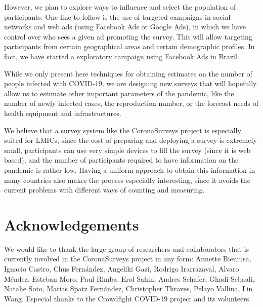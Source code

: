 \documentclass[sigconf]{acmart}
\newcommand{\af}[1]{{#1}}
\begin{document}
However, we plan to explore ways to influence \af{and select} the population of participants. One line to follow is the use of targeted campaigns in social networks and web ads (using Facebook Ads or Google Ads), in which we have control over who sees a given ad promoting the survey. This will allow targeting participants from certain geographical areas and certain demographic profiles. \af{In fact, we have started a exploratory campaign using Facebook Ads in Brazil.}

While we only present here techniques for obtaining estimates on the number of people infected with COVID-19, we are designing new surveys that will hopefully allow us to estimate other important parameters of the pandemic, like the number of newly infected cases, the reproduction number, or the forecast needs of health equipment and infrastructures.

We believe that a survey system like the CoronaSurveys project is especially suited for LMICs, since the cost of preparing and deploying a survey is extremely small, participants can use very simple devices to fill the survey (since it is web based), and the number of participants required to have information on the pandemic is rather low. Having a uniform approach to obtain this information in many countries also makes the process especially interesting, since it avoids the current problems with different ways of counting and measuring. 


\section{Acknowledgements}

We would like to thank the large group of researchers and collaborators that is currently involved in the CoronaSurveys project in any form: 
Annette Bieniusa,
Ignacio Castro, 
Chus Fernández,
Angeliki Gazi, 
Rodrigo Irarrazaval,
Alvaro Méndez,
Esteban Moro,
Paul Rimba,
Erol Sahin,
Andres Schafer,
Ghadi Sebaali,
Natalie Soto,
Matias Spatz Fernández,
Christopher Thraves, 
Pelayo Vallina, 
Lin Wang. Especial thanks to the Crowdfight COVID-19 project \cite{crowdfight} and its volunteers.






\end{document}
